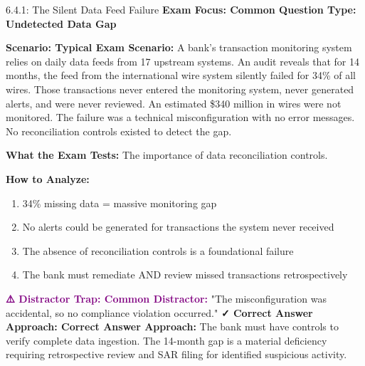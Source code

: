 \documentclass[11pt,a4paper]{beamer}
\newcommand{\examfocus}[1]{\textcolor{orange!80!black}{\textbf{Exam Focus: #1}}}
\newcommand{\trap}[1]{\textcolor{purple}{\textbf{⚠️ Distractor Trap: #1}}}
\newcommand{\correct}[1]{\textcolor{green!50!black}{\textbf{✓ Correct Answer Approach: #1}}}
\newcommand{\scenario}[1]{\textcolor{blue!70!black}{\textbf{Scenario: #1}}}
\begin{document}
	\begin{frame}{6.4.1: The Silent Data Feed Failure}
		\examfocus{Common Question Type: Undetected Data Gap}
		
		\scenario{Typical Exam Scenario:}
		A bank's transaction monitoring system relies on daily data feeds from 17 upstream systems. An audit reveals that for 14 months, the feed from the international wire system silently failed for 34\% of all wires. Those transactions never entered the monitoring system, never generated alerts, and were never reviewed. An estimated \$340 million in wires were not monitored. The failure was a technical misconfiguration with no error messages. No reconciliation controls existed to detect the gap.
		
		\textbf{What the Exam Tests:} The importance of data reconciliation controls.
		
		\textbf{How to Analyze:}
		\begin{enumerate}
			\item 34\% missing data = massive monitoring gap
			\item No alerts could be generated for transactions the system never received
			\item The absence of reconciliation controls is a foundational failure
			\item The bank must remediate AND review missed transactions retrospectively
		\end{enumerate}
		
		\trap{Common Distractor:} "The misconfiguration was accidental, so no compliance violation occurred."
		\correct{Correct Answer Approach:} The bank must have controls to verify complete data ingestion. The 14-month gap is a material deficiency requiring retrospective review and SAR filing for identified suspicious activity.
	\end{frame}
	
\end{document}
